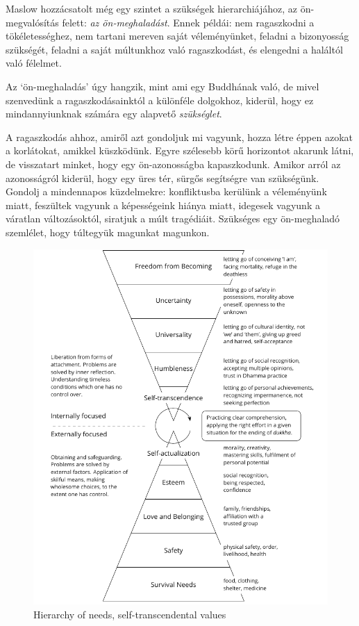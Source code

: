 Maslow hozzácsatolt még egy szintet a szükségek hierarchiájához, az
ön-megvalósítás felett: \emph{az ön-meghaladást}. Ennek példái: nem
ragaszkodni a tökéletességhez, nem tartani mereven saját véleményünket,
feladni a bizonyosság szükségét, feladni a saját múltunkhoz való
ragaszkodást, és elengedni a haláltól való félelmet.

Az `ön-meghaladás' úgy hangzik, mint ami egy Buddhának való, de mivel
szenvedünk a ragaszkodásainktól a különféle dolgokhoz, kiderül, hogy ez
mindannyiunknak számára egy alapvető \emph{szükséglet}.

\enlargethispage*{\baselineskip}

A ragaszkodás ahhoz, amiről azt gondoljuk mi vagyunk, hozza létre éppen
azokat a korlátokat, amikkel küszködünk. Egyre szélesebb körű horizontot
akarunk látni, de visszatart minket, hogy egy ön-azonosságba
kapaszkodunk. Amikor arról az azonosságról kiderül, hogy egy üres tér,
sürgős segítségre van szükségünk. Gondolj a mindennapos küzdelmekre:
konfliktusba kerülünk a véleményünk miatt, feszültek vagyunk a
képességeink hiánya miatt, idegesek vagyunk a váratlan változásoktól,
siratjuk a múlt tragédiáit. Szükséges egy ön-meghaladó szemlélet, hogy
túltegyük magunkat magunkon.

\clearpage
\figurepagelayout

\begin{figure}[h]
\caption{Hierarchy of needs, self-transcendental values}\label{fig-self-transcendental}
\bigskip
\includegraphics[width=\linewidth]{./manuscript/tex/diagrams/self-transcendental-values.pdf}
\end{figure}

